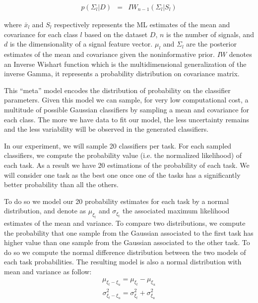 \begin{eqnarray}
p(\Sigma_l|D) & = & IW_{n-1}(\Sigma_l | S_l)
\label{eq:jeffreyscov}
\end{eqnarray}

where $\bar{x}_l$ and $S_l$ respectively represents the ML estimates of the mean and covariance for each class $l$ based on the dataset $D$, $n$ is the number of signals, and $d$ is the dimensionality of a signal feature vector.
$\mu_l$ and $\Sigma_l$ are the posterior estimates of the mean and covariance given the noninformative prior. $IW$ denotes an Inverse Wishart function which is the multidimensional generalization of the inverse Gamma, it represents a probability distribution on covariance matrix.

This ``meta'' model encodes the distribution of probability on the classifier parameters. Given this model we can sample, for very low computational cost, a multitude of possible Gaussian classifiers by sampling a mean and covariance for each class. The more we have data to fit our model, the less uncertainty remains and the less variability will be observed in the generated classifiers.

In our experiment, we will sample 20 classifiers per task. For each sampled classifiers, we compute the probability value (i.e. the normalized likelihood) of each task. As a result we have 20 estimations of the probability of each task. We will consider one task as the best one once one of the tasks has a significantly better probability than all the others.

To do so we model our 20 probability estimates for each task by a normal distribution, and denote as $\mu_{\xi_t}$ and $\sigma_{\xi_t}$ the associated maximum likelihood estimates of the mean and variance. To compare two distributions, we compute the probability that one sample from the Gaussian associated to the first task has higher value than one sample from the Gaussian associated to the other task. To do so we compute the normal difference distribution between the two models of each task probabilities. The resulting model is also a normal distribution with mean and variance as follow:
%
\begin{eqnarray}
\mu_{\xi_t - \xi_u} = \mu_{\xi_t} - \mu_{\xi_u} 
\label{eq:meandiffgaussian}
\end{eqnarray}
%
\begin{eqnarray}
\sigma^2_{\xi_t - \xi_u} = \sigma^2_{\xi_t} + \sigma^2_{\xi_u}
\label{eq:variancediffgaussian}
\end{eqnarray}

